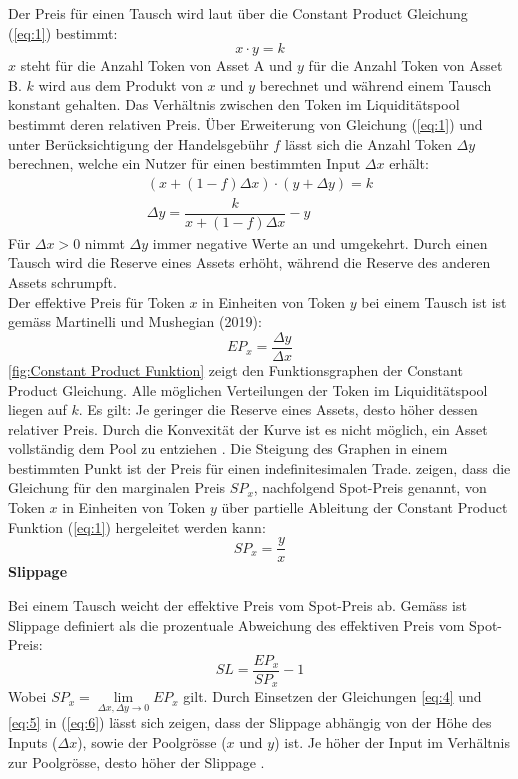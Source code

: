 \documentclass[12pt,a4paper,titlepage,oneside,english]{article}
\begin{document}
Der Preis für einen Tausch wird laut \citet{Adams2020} über die Constant Product Gleichung (\ref{eq:1}) bestimmt: 
\begin{equation}
x \cdot y = k \label{eq:1}
\end{equation}
\newpage
$x$ steht für die Anzahl Token von Asset A und $y$ für die Anzahl Token von Asset B. $k$ wird aus dem Produkt von $x$ und $y$ berechnet und während einem Tausch konstant gehalten. Das Verhältnis zwischen den Token im Liquiditätspool bestimmt deren relativen Preis. Über Erweiterung von Gleichung (\ref{eq:1}) und unter Berücksichtigung der Handelsgebühr $f$ lässt sich die Anzahl Token $\Delta y$ berechnen, welche ein Nutzer für einen bestimmten Input $\Delta x$ erhält:
\begin{align}
(x+ (1-f)\Delta x)\cdot (y+ \Delta y) = k \\ 
\Delta y = \dfrac{k}{x+ (1-f) \Delta x} - y \label{eq:2+3}
\end{align}
Für $\Delta x>0$ nimmt $\Delta y$ immer negative Werte an und umgekehrt. Durch einen Tausch wird die Reserve eines Assets erhöht, während die Reserve des anderen Assets schrumpft. \citep[vgl.][S.10]{Schaer2020}\\
Der effektive Preis für Token $x$ in Einheiten von Token $y$ bei einem Tausch ist ist gemäss Martinelli und Mushegian (2019):
\begin{equation}
EP_{x} = \dfrac{\Delta y}{\Delta x} \label{eq:4}
\end{equation}
\autoref{fig:Constant Product Funktion} zeigt den Funktionsgraphen der Constant Product Gleichung. Alle möglichen Verteilungen der Token im Liquiditätspool liegen auf $k$. Es gilt: Je geringer die Reserve eines Assets, desto höher dessen relativer Preis. Durch die Konvexität der Kurve ist es nicht möglich, ein Asset vollständig dem Pool zu entziehen \citep{Buterin2018}.
Die Steigung des Graphen in einem bestimmten Punkt ist der Preis für einen indefinitesimalen Trade. \citet[S.4]{Angeris2019} zeigen, dass die Gleichung für den marginalen Preis  $SP_{x}$, nachfolgend Spot-Preis genannt, von Token $x$ in Einheiten von Token $y$ über partielle Ableitung der Constant Product Funktion (\ref{eq:1}) hergeleitet werden kann:  %
\begin{equation}
SP_{x} = \dfrac{y}{x} \label{eq:5}
\end{equation}
\newpage
\textbf{Slippage}

Bei einem Tausch weicht der effektive Preis vom Spot-Preis ab.
Gemäss \citet{Martinelli2020} ist Slippage definiert als die prozentuale Abweichung des effektiven Preis vom Spot-Preis: 
\begin{equation}
SL = \dfrac{EP_{x}}{SP_{x}} - 1 \label{eq:6}
\end{equation}
Wobei $ SP_{x} = \lim\limits_{\Delta x, \Delta y \to 0} EP_{x} $ gilt. Durch Einsetzen der Gleichungen \ref{eq:4} und \ref{eq:5} in (\ref{eq:6}) lässt sich zeigen, dass der Slippage abhängig von der Höhe des Inputs ($\Delta x$), sowie der Poolgrösse ($x$ und $y$) ist. Je höher der Input im Verhältnis zur Poolgrösse, desto höher der Slippage \citep{Berenzon2020}.\\
\end{document}
